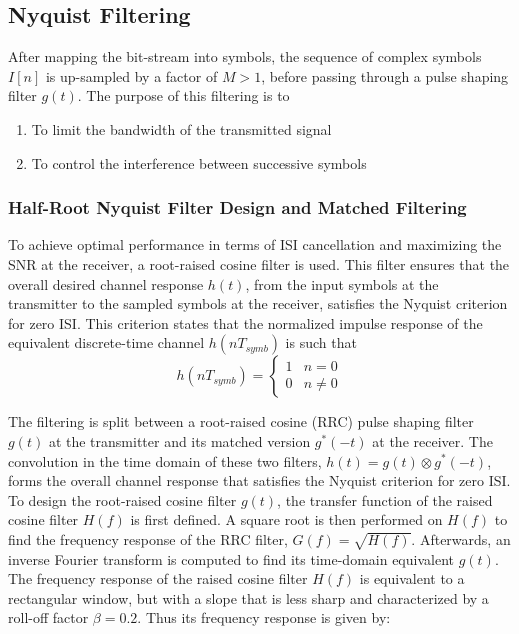\subsection{Nyquist Filtering}
After mapping the bit-stream into symbols, the sequence of complex symbols $I[n]$ is up-sampled by a factor of $M > 1$, before passing through a pulse shaping filter $g(t)$. The purpose of this filtering is to
\begin{enumerate}
	\item To limit the bandwidth of the transmitted signal
	\item To control the interference between successive symbols
\end{enumerate}
\subsubsection{Half-Root Nyquist Filter Design and Matched Filtering}
To achieve optimal performance in terms of ISI cancellation and maximizing the SNR at the receiver, a root-raised cosine filter is used. This filter ensures that the overall desired channel response $h(t)$, from the input symbols at the transmitter to the sampled symbols at the receiver, satisfies the Nyquist criterion for zero ISI. This criterion states that the normalized impulse response of the equivalent discrete-time channel $h(nT_{symb})$  is such that
\begin{equation}
	h(nT_{symb}) = \begin{cases}
		1 & n=0 \\
		0 & n \neq 0
	\end{cases}
\end{equation}

The filtering is split between a root-raised cosine (RRC) pulse shaping filter $g(t)$ at the transmitter and its matched version $g^*(-t)$ at the receiver. The convolution in the time domain of these two filters, $h(t) = g(t) \otimes g^*(-t)$, forms the overall channel response that satisfies the Nyquist criterion for zero ISI.
To design the root-raised cosine filter $g(t)$, the transfer function of the raised cosine filter $H(f)$ is first defined. A square root is then performed on $H(f)$ to find the frequency response of the RRC filter, $G(f) = \sqrt{H(f)}$. Afterwards, an inverse Fourier transform is computed to find its time-domain equivalent $g(t)$.\\

The frequency response of the raised cosine filter $H(f)$ is equivalent to a rectangular window, but with a slope that is less sharp and characterized by a roll-off factor $\beta = 0.2$. Thus its frequency response is given by:

